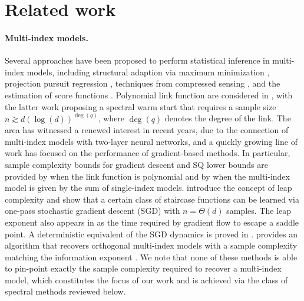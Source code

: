 \section{Related work}
\label{sec:related}


\paragraph{Multi-index models.}
Several approaches have been proposed to perform statistical inference in multi-index models, including 
structural adaption via maximum minimization \cite{dalalyan2008new}, 
projection pursuit regression \cite{yuan2011identifiability},
techniques from compressed sensing 
\cite{fornasier2012learning}, and the estimation of score functions
\cite{babichev2018slice}. 
Polynomial link function are considered in \citet{andoni2014learning,Chen_Meka}, with the latter work proposing a spectral warm start that requires a sample size $ n \gtrsim d (\log(d))^{\deg(q)} $, where $\deg(q)$ denotes the degree of the link. The area has witnessed a renewed interest in recent years, due to the connection of multi-index models with two-layer neural networks, and a quickly growing line of work has focused on the performance of gradient-based methods. In particular, sample complexity bounds for gradient descent and SQ lower bounds are provided by \citet{damian2022neural} when the link function is polynomial and by  \citet{Oko_GAM} when the multi-index model is given by the sum of single-index models. 
\citet{abbe2022merged,abbe2023sgd} introduce the concept of leap complexity and show that a certain class of staircase functions can be learned via one-pass stochastic gradient descent (SGD) with $n = \Theta(d)$ samples. The leap exponent also appears in \cite{MIM_GF} as the time required by gradient flow to escape a saddle point. 
A deterministic equivalent of the SGD dynamics is proved in \citet{collins2024hitting}.  
\citet{Ren_Lee} provides an algorithm that recovers orthogonal multi-index models with a sample complexity matching the information exponent 
\cite{arous2021online}. 
We note that none of these methods is able to pin-point exactly the sample complexity required to recover a multi-index model, which constitutes the focus of our work and is achieved via the class of spectral methods reviewed below.


